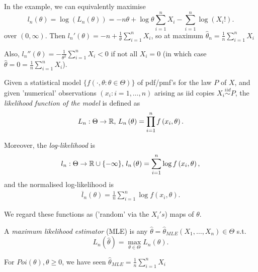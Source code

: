 \documentclass[a4paper]{article}
\begin{document}
In the example, we can equivalently maximise 
\[
	l_{n}\left( \theta \right) = \log\left( L_{n}\left( \theta \right)  \right) = -n\theta + \log\theta \sum_{i=1}^{n} X_{i}  - \sum_{i=1}^{n} \log\left( X_{i}! \right)
.\]
over $(0, \infty)$. Then  $l_{n}'\left( \theta \right) = -n + \frac{1}{\theta}\sum_{i=1}^{n} X_{i}$, so at maximum $\hat{\theta}_{n} = \frac{1}{n} \sum_{i=1}^{n} X_{i}$

Also, $l_{n}''\left( \theta \right) = - \frac{1}{\theta ^2} \sum_{i=1}^{n} X_{i} < 0$ if not all $X_{i} = 0$ (in which case $\hat{\theta} = 0 = \frac{1}{n} \sum_{i=1}^{n} X_{i}$).

\newpage

\begin{defn}
	Given a statistical model $\{f\left( \cdot , \theta : \theta \in \Theta \right) \} $ of pdf/pmf's for the law $P$ of $X$, and given 'numerical' observations  $\left( x_{i}: i=1,\ldots,n \right) $ arising as iid copies $X_{i}\stackrel{iid}{\sim}P$, the \textit{likelihood function of the model} is defined as
	\begin{align*}
		L_{n} : \Theta \to \mathbb{R} \text{, } L_{n}\left( \theta \right) = \prod_{i=1}^{n} f\left( x_{i}, \theta \right)   
	.\end{align*}

Moreover, the \textit{log-likelihood} is
\begin{align*}
	l_{n}: \Theta \to \mathbb{R} \cup \{-\infty\} \text{, } l_{n}\left( \theta \right) = \sum_{i=1}^{n}\log f\left( x_{i}, \theta \right)
,\end{align*}
and the normalised log-likelihood is
\begin{align*}
	\overline{l}_{n}\left( \theta \right) = \frac{1}{n}\sum_{i=1}^{n}\log f\left( x_{i}, \theta \right) 
.\end{align*}
\end{defn}
We regard these functions as ('random' via the $X_{i}'s$) maps of $\theta$.

\begin{defn}
	A \textit{maximum likelihood estimator} (MLE) is any $\hat{\theta} = \hat{\theta}_{MLE} \left( X_{1}, \ldots, X_{n} \right) \in \Theta$ s.t. \[
		L_{n}( \hat{\theta}) = \max_{\theta \in \Theta} L_{n}\left( \theta \right) 
	.\] 
\end{defn}

\begin{eg}
	For $Poi(\theta), \theta \ge 0$, we have seen $\hat{\theta}_{MLE} = \frac{1}{n} \sum_{i=1}^{n} X_{i}$
\end{eg}
\end{document}
